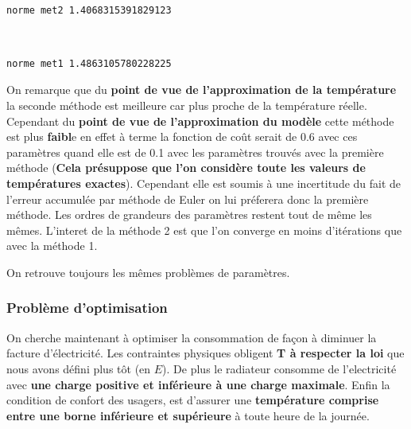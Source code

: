 \documentclass[11pt]{article}
\begin{document}
    \begin{center}
    \end{center}
    { \hspace*{\fill} \\}
    
    \begin{Verbatim}[commandchars=\\\{\}]
norme met2 1.4068315391829123
    \end{Verbatim}

    \begin{center}
    \end{center}
    { \hspace*{\fill} \\}
    
    \begin{Verbatim}[commandchars=\\\{\}]
norme met1 1.4863105780228225
    \end{Verbatim}

    On remarque que du \textbf{point de vue de l'approximation de la
température} la seconde méthode est meilleure car plus proche de la
température réelle. Cependant du \textbf{point de vue de l'approximation
du modèle} cette méthode est plus \textbf{faibl}e en effet à terme la
fonction de coût serait de 0.6 avec ces paramètres quand elle est de 0.1
avec les paramètres trouvés avec la première méthode (\textbf{Cela
présuppose que l'on considère toute les valeurs de températures
exactes}). Cependant elle est soumis à une incertitude du fait de
l'erreur accumulée par méthode de Euler on lui préferera donc la
première méthode. Les ordres de grandeurs des paramètres restent tout de
même les mêmes. L'interet de la méthode 2 est que l'on converge en moins
d'itérations que avec la méthode 1.

On retrouve toujours les mêmes problèmes de paramètres.

    \hypertarget{probluxe8me-doptimisation}{%
\subsubsection{Problème
d'optimisation}\label{probluxe8me-doptimisation}}

On cherche maintenant à optimiser la consommation de façon à diminuer la
facture d'électricité. Les contraintes physiques obligent \textbf{T à
respecter la loi} que nous avons défini plus tôt (en \(E\)). De plus le
radiateur consomme de l'electricité avec \textbf{une charge positive et
inférieure à une charge maximale}. Enfin la condition de confort des
usagers, est d'assurer une \textbf{température comprise entre une borne
inférieure et supérieure} à toute heure de la journée.
\end{document}
